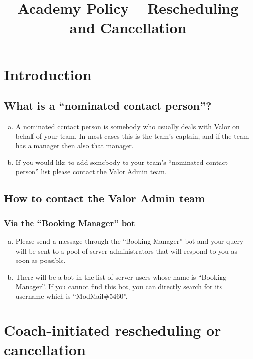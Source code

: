 \documentclass[10pt]{article}
\begin{document}
\title{Academy Policy -- Rescheduling and Cancellation}


\section{Introduction}

\subsection{What is a ``nominated contact person''?}
\begin{enumerate}[(a)]
\item
A nominated contact person is somebody who usually deals with Valor on behalf of your team. In most cases this is the team's captain, and if the team has a manager then also that manager.

\item
If you would like to add somebody to your team's ``nominated contact person'' list please contact the Valor Admin team.
\end{enumerate}

\subsection{How to contact the Valor Admin team}
\subsubsection{Via the ``Booking Manager'' bot}
\begin{enumerate}[(a)]
\item
Please send a message through the ``Booking Manager'' bot and your query will be sent to a pool of server administrators that will respond to you as soon as possible.

\item
There will be a bot in the list of server users whose name is ``Booking Manager''. If you cannot find this bot, you can directly search for its username which is \mbox{``ModMail\#5460''}.
\end{enumerate}


\section{Coach-initiated rescheduling or cancellation}
\end{document}
